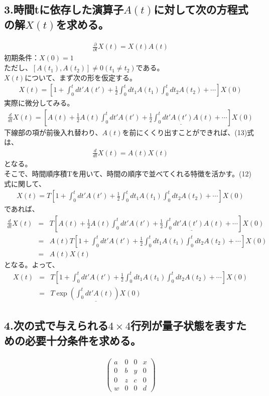 \documentclass[10pt]{jreport}
\begin{document}
\subsection*{3.時間tに依存した演算子$A(t)$に対して次の方程式の解$X(t)$を求める。}
\begin{eqnarray}
\frac{\partial}{\partial t}X(t) =X(t)A(t) \nonumber
\end{eqnarray}
初期条件：$X(0)=1$\\
ただし、$[A(t_1),A(t_2)]\neq 0 (t_1 \neq t_2)$である。\\

$X(t)$について、まず次の形を仮定する。\\
\begin{eqnarray}
X(t) = [1+\int_0^tdt'A(t')+\frac{1}{2}\int^t_0dt_1 A(t_1)\int^t_0dt_2A(t_2)+\cdots ]X(0)
\end{eqnarray}
実際に微分してみる。\\
\begin{eqnarray}
\frac{d}{dt}X(t) = [A(t)+\frac{1}{2}A(t)\int^t_0dt'A(t')+\underline{\frac{1}{2}\int^t_0dt'A(t')A(t)}+\cdots]X(0)
\end{eqnarray}
下線部の項が前後入れ替わり、$A(t)$を前にくくり出すことができれば、(13)式は、
\begin{eqnarray}
\frac{d}{dt}X(t) = A(t) X(t) \nonumber
\end{eqnarray}
となる。\\
そこで、時間順序積Tを用いて、時間の順序で並べてくれる特徴を活かす。(12)式に関して、
\begin{eqnarray}
X(t) = T[1+\int_0^tdt'A(t')+\frac{1}{2}\int^t_0dt_1 A(t_1)\int^t_0dt_2A(t_2)+\cdots]X(0) \nonumber
\end{eqnarray}
であれば、
\begin{eqnarray}
\frac{d}{dt}X(t)&=&T [A(t)+\frac{1}{2}A(t)\int^t_0dt'A(t')+\underline{\frac{1}{2}\int^t_0dt'A(t')A(t)}+\cdots]X(0) \nonumber \\
&=& A(t) T[1+\int_0^tdt'A(t')+\frac{1}{2}\int^t_0dt_1 A(t_1)\int^t_0dt_2A(t_2)+\cdots]X(0) \nonumber \\
&=& A(t)X(t)
\end{eqnarray}
となる。よって、
\begin{eqnarray}
X(t) &=& T[1+\int_0^tdt'A(t')+\frac{1}{2}\int^t_0dt_1 A(t_1)\int^t_0dt_2A(t_2)+\cdots]X(0) \nonumber \\
&=& \underline{T\exp(\int^t_0dt'A(t) )X(0)}
\end{eqnarray}

\subsection*{4.次の式で与えられる$4 \times 4$行列が量子状態を表すための必要十分条件を求める。}
\begin{eqnarray}
\left(
    \begin{array}{cccc}
      a & 0 & 0 &x\\
      0 & b & y & 0\\
      0 & z & c & 0 \\
      w & 0& 0&d 
      \end{array} \nonumber
  \right)
\end{eqnarray}
\end{document}
